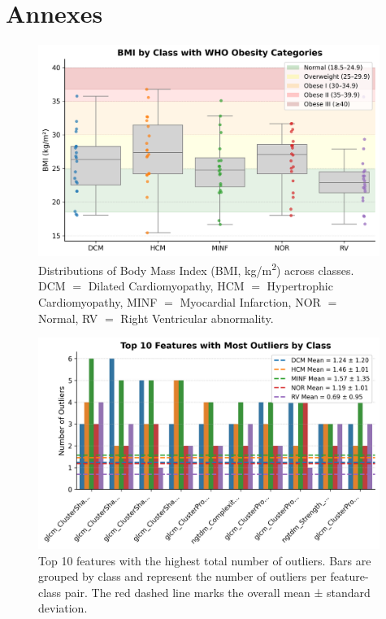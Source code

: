 \renewcommand{\thefigure}{A.\arabic{figure}}
\setcounter{figure}{0}

\section*{Annexes}

\begin{figure}[H]
	\begin{center}
		\includegraphics[width=0.99\textwidth]{../images/eda/bmi_by_class.png}
	\end{center}
	\caption{Distributions of Body Mass Index (BMI, kg/m\textsuperscript{2})
		across classes. DCM $=$ Dilated Cardiomyopathy, HCM $=$ Hypertrophic
		Cardiomyopathy, MINF $=$ Myocardial Infarction, NOR $=$ Normal, RV $=$ Right
		Ventricular abnormality.}
	\label{fig:figA1}
\end{figure}

\hfill

\begin{figure}[H]
	\begin{center}
		\includegraphics[width=0.99\textwidth]{../images/eda/outliers.png}
	\end{center}
	\caption{Top 10 features with the highest total number of outliers. Bars are
		grouped by class and represent the number of outliers per feature-class pair.
		The red dashed line marks the overall mean ± standard deviation.}
	\label{fig:figA2}
\end{figure}



